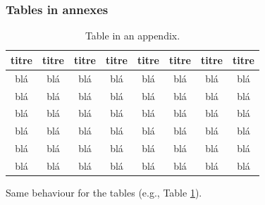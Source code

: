 \documentclass[letterpaper%
, twoside%
, 12pt%
,these%
, english%
,creativecommons,hyperref%
]{thETS}
\begin{document}
\subsubsection{Tables in annexes}

\begin{table}
  \parbox{0.65\textwidth}{\caption{Table in an appendix.}\label{tab:testAp}}

  \begin{tabular}{|c|c|c|c|c|c|c|c|}
    \hline
    {\bf titre} & {\bf titre} & {\bf titre} & {\bf titre} & {\bf titre} & {\bf titre} & {\bf titre} & {\bf titre} \\
    \hline
    blá & blá & blá & blá & blá & blá & blá & blá \\
    \hline
    blá & blá & blá & blá & blá & blá & blá & blá \\
    \hline
    blá & blá & blá & blá & blá & blá & blá & blá \\
    \hline
    blá & blá & blá & blá & blá & blá & blá & blá \\
    \hline
    blá & blá & blá & blá & blá & blá & blá & blá \\
    \hline
    blá & blá & blá & blá & blá & blá & blá & blá \\
    \hline
  \end{tabular}
\end{table}

Same behaviour for the tables (e.g., Table \ref{tab:testAp}).



\newpage
\begin{spacing}{1}
  \nocite{*} %


\end{spacing}


\newpage
\begin{spacing}{1}


\end{spacing}
\end{document}
